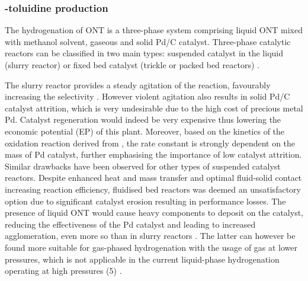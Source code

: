 
\subsubsection{\ortho-toluidine production} \label{sec:otol}

The hydrogenation of ONT is a three-phase system comprising liquid ONT mixed with methanol solvent, gaseous  and solid Pd/C catalyst. Three-phase catalytic reactors can be classified in two main types: suspended catalyst in the liquid (slurry reactor) or fixed bed catalyst (trickle or packed bed reactors) \cite{wood_methodological_nodate}. 

The slurry reactor provides a steady agitation of the reaction, favourably increasing the selectivity \cite{p_a_ramachandran_recent_1987}. However violent agitation also results in solid Pd/C catalyst attrition, which is very undesirable due to the high cost of precious metal Pd. Catalyst regeneration would indeed be very expensive thus lowering the economic potential (EP) of this plant. Moreover, based on the kinetics of the oxidation reaction derived from  \textcite{rajadhyaksha_solvent_1986}, the rate constant is strongly dependent on the mass of Pd catalyst, further emphasising the importance of low catalyst attrition. Similar drawbacks have been observed for other types of suspended catalyst reactors. Despite enhanced heat and mass transfer and optimal fluid-solid contact increasing reaction efficiency, fluidised bed reactors was deemed an unsatisfactory option due to significant catalyst erosion resulting in performance losses. The presence of liquid ONT would cause heavy components to deposit on the catalyst, reducing the effectiveness of the Pd catalyst and leading to increased agglomeration, even more so than in slurry reactors \cite{farrell_kinetics_1979}. The latter can however be found more suitable for gas-phased hydrogenation with the usage of  gas at lower pressures, which is not applicable in the current liquid-phase hydrogenation operating at high pressures (\SI{5}{\atm}) \cite{ranade_chapter_2011}.

